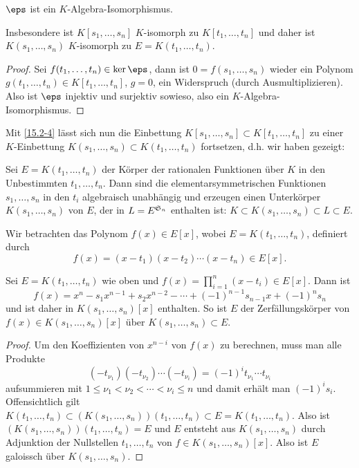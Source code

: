 \begin{st} \label{20.4-5}
	$\eps$ ist ein $K$-Algebra-Isomorphismus.

	Insbesondere ist $K[s_1, \dotsc, s_n]$ $K$-isomorph zu $K[t_1, \dotsc, t_n]$ und daher ist $K(s_1, \dotsc, s_n)$ $K$-isomorph zu $E = K(t_1, \dotsc, t_n)$.
	\begin{proof}
		Sei $f(t_1, \dotsc, t_n) \in \ker \eps$, dann ist $0 = f(s_1, \dotsc, s_n)$ wieder ein Polynom $g(t_1, \dotsc, t_n) \in K[t_1, \dotsc, t_n]$, $g = 0$, ein Widerspruch (durch Ausmultiplizieren).
		Also ist $\eps$ injektiv und surjektiv sowieso, also ein $K$-Algebra-Isomorphismus.
	\end{proof}
\end{st}

Mit \ref{15.2-4} lässt sich nun die Einbettung $K[s_1, \dotsc, s_n] \subset K[t_1, \dotsc, t_n]$ zu einer $K$-Einbettung $K(s_1, \dotsc, s_n) \subset K(t_1, \dotsc, t_n)$ fortsetzen, d.h. wir haben gezeigt:

\begin{kor} \label{20.4-6}
	Sei $E = K(t_1, \dotsc, t_n)$ der Körper der rationalen Funktionen über $K$ in den Unbestimmten $t_1, \dotsc, t_n$.
	Dann sind die elementarsymmetrischen Funktionen $s_1, \dotsc, s_n$ in den $t_i$ algebraisch unabhängig und erzeugen einen Unterkörper $K(s_1, \dotsc, s_n)$ von $E$, der in $L = E^{\S_n}$ enthalten ist: $K \subset K(s_1, \dotsc, s_n) \subset L \subset E$.
\end{kor}

Wir betrachten das Polynom $f(x) \in E[x]$, wobei $E = K(t_1, \dotsc, t_n)$, definiert durch
\[
	f(x) = (x-t_1)(x-t_2) \dotsb (x-t_n) \in E[x].
\]

\begin{lem} \label{20.4-7}
	Sei $E = K(t_1, \dotsc, t_n)$ wie oben und $f(x) = \prod_{i=1}^n (x - t_i) \in E[x]$.
	Dann ist
	\[
		f(x) = x^n - s_1 x^{n-1} + s_2 x^{n-2} - \dotsb + (-1)^{n-1} s_{n-1} x + (-1)^n s_n
	\]
	und ist daher in $K(s_1,\dotsc, s_n)[x]$ enthalten.
	So ist $E$ der Zerfällungskörper von $f(x) \in K(s_1, \dotsc, s_n)[x]$ über $K(s_1, \dotsc, s_n) \subset E$.
	\begin{proof}
		Um den Koeffizienten von $x^{n-i}$ von $f(x)$ zu berechnen, muss man alle Produkte
		\[
			(-t_{\nu_1})(-t_{\nu_2}) \dotsb (-t_{\nu_i})
			= (-1)^i t_{\nu_1} \dotsb t_{\nu_i}
		\]
		aufsummieren mit $1 \le \nu_1 < \nu_2 < \dotsb < \nu_i \le n$ und damit erhält man $(-1)^i s_i$.
		Offensichtlich gilt $K(t_1, \dotsc, t_n) \subset (K(s_1,\dotsc, s_n))(t_1, \dotsc, t_n) \subset E = K(t_1, \dotsc, t_n)$.
		Also ist $(K(s_1,\dotsc, s_n))(t_1, \dotsc, t_n) = E$ und $E$ entsteht aus $K(s_1,\dotsc, s_n)$ durch Adjunktion der Nullstellen $t_1, \dotsc, t_n$ von $f \in K(s_1,\dotsc, s_n)[x]$.
		Also ist $E$ galoissch über $K(s_1, \dotsc, s_n)$.
	\end{proof}
\end{lem}

